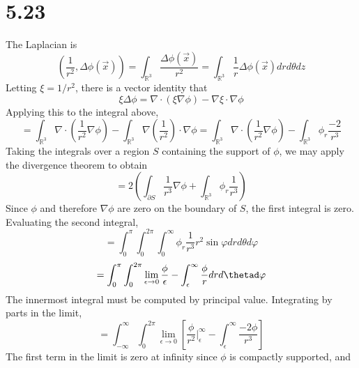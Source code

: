 \message{ !name(hw2.tex)}\documentclass{article}
\begin{document}
\section*{5.23}
The Laplacian is
\[\left(\frac{1}{r^2},\Delta\phi(\vec{x})\right)=\int_{\mathbb{R}^3}\frac{\Delta\phi(\vec{x})}{r^2}=\int_{\mathbb{R}^3}\frac{1}{r}\Delta\phi(\vec{x})drd\theta dz\]
Letting $\xi=1/r^2$, there is a vector identity that
\[\xi\Delta\phi=\nabla\cdot(\xi\nabla\phi)-\nabla\xi\cdot\nabla\phi\]
Applying this to the integral above,
\[=\int_{\mathbb{R}^3}\nabla\cdot\left(\frac{1}{r^2}\nabla\phi\right)-\int_{\mathbb{R}^3}\nabla\left(\frac{1}{r^2}\right)\cdot\nabla\phi=\int_{\mathbb{R}^3}\nabla\cdot\left(\frac{1}{r^2}\nabla\phi\right)-\int_{\mathbb{R}^3}\phi_r\frac{-2}{r^3}\]
Taking the integrals over a region $S$ containing the support of $\phi$, we may apply the divergence theorem to obtain
\[=2\left(\int_{\partial S}\frac{1}{r^3}\nabla\phi+\int_{\mathbb{R}^3}\phi_r\frac{1}{r^3}\right)\]
Since $\phi$ and therefore $\nabla\phi$ are zero on the boundary of $S$, the first integral is zero. Evaluating the second integral,
\[=\int_{0}^\pi\int_0^{2\pi}\int_0^\infty\phi_r\frac{1}{r^3}r^2\sin\varphi drd\theta d\varphi\]
\[=\int_0^\pi\int_0^{2\pi}\lim_{\epsilon\to 0}\frac{\phi}{\epsilon}-\int_\epsilon^\infty \frac{\phi}{r}drd\thetad\varphi\]
The innermost integral must be computed by principal value. Integrating by parts in the limit,
\[=\int_{-\infty}^\infty\int_0^{2\pi}\lim_{\epsilon\to 0}\left[ \frac{\phi}{r^2}\bigg|_\epsilon^\infty-\int_\epsilon^\infty\frac{-2\phi}{r^3} \right]\]
The first term in the limit is zero at infinity since $\phi$ is compactly supported, and
\end{document}

